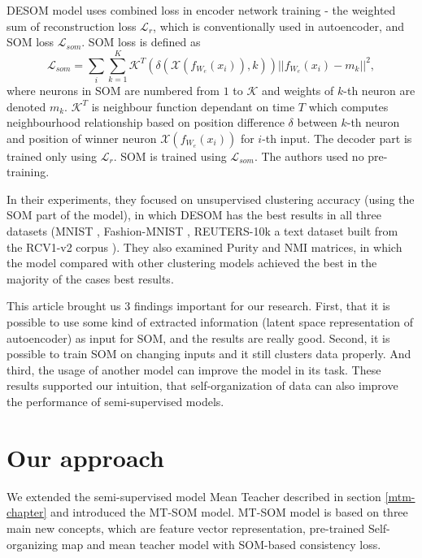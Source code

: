 DESOM model uses combined loss in encoder network training - the weighted sum of reconstruction loss $\mathcal{L}_r$, which is conventionally used in autoencoder, and SOM loss $\mathcal{L}_{som}$.
SOM loss is defined as $$\mathcal{L}_{som} = \sum_i \sum_{k=1}^K \mathcal{K}^T (\delta (\mathcal{X}(f_{W_e}(x_i)), k)) {||f_{W_e}(x_i) - m_k||}^2,$$ where neurons in SOM are numbered from $1$ to $\mathcal{K}$ and weights of $k$-th neuron are denoted $m_k$. $\mathcal{K}^T$ is neighbour function dependant on time $T$ which computes neighbourhood relationship based on position difference $\delta$ between $k$-th neuron and position of winner neuron $\mathcal{X}(f_{W_e}(x_i))$ for $i$-th input.
The decoder part is trained only using $\mathcal{L}_r$. SOM is trained using $\mathcal{L}_{som}$. The authors used no pre-training.

In their experiments, they focused on unsupervised clustering accuracy (using the SOM part of the model), in which DESOM has the best results in all three datasets (MNIST \cite{deng2012mnist}, Fashion-MNIST \cite{xiao2017fashionmnist}, REUTERS-10k a text dataset built from the RCV1-v2 corpus \cite{rcvi}). They also examined Purity and NMI matrices, in which the model compared with other clustering models achieved the best in the majority of the cases best results.

This article brought us $3$ findings important for our research. First, that it is possible to use some kind of extracted information (latent space representation of autoencoder) as input for SOM, and the results are really good. Second, it is possible to train SOM on changing inputs and it still clusters data properly. And third, the usage of another model can improve the model in its task. These results supported our intuition, that self-organization of data can also improve the performance of semi-supervised models.


\section{Our approach}
\label{our-approach}
We extended the semi-supervised model Mean Teacher described in section \ref{mtm-chapter} and introduced the MT-SOM model. MT-SOM model is based on three main new concepts, which are feature vector representation, pre-trained Self-organizing map and mean teacher model with SOM-based consistency loss.

